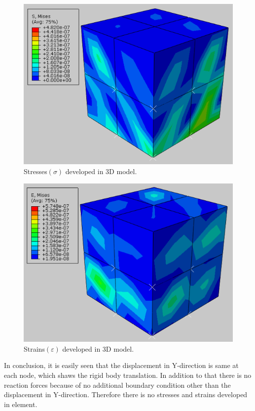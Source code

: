 \documentclass[12pt]{article}
\begin{document}
\begin{figure}[H]
	\begin{center}
		\includegraphics[scale=1]{3d_model_S_crop.png}  
	\end{center}  
	\caption{Stresses$(\sigma)$ developed in 3D model.}
\end{figure}
\begin{figure}[H]
	\begin{center}
		\includegraphics[scale=1]{3d_model_E_crop.png}  
	\end{center}  
	\caption{Strains$(\varepsilon)$ developed in 3D model.}
\end{figure}
In conclusion, it is easily seen that the displacement in Y-direction is same at each node, which shaws the rigid body translation. In addition to that there is no reaction forces because of no additional boundary condition other than the displacement in Y-direction. Therefore there is no stresses and strains developed in element.
\end{document}
